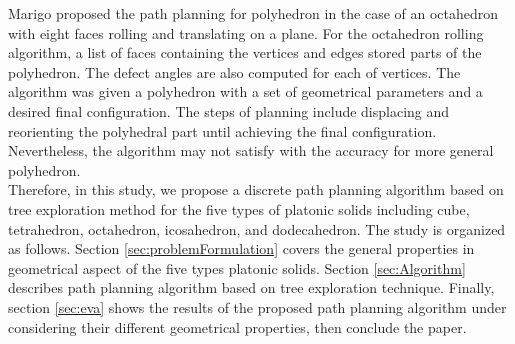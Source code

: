 \noindent Marigo \cite{Marigo00_PlanningMotion_Polyhedra_Rolling} proposed the path planning for polyhedron in the case of an octahedron with eight faces rolling and translating on a plane. For the octahedron rolling algorithm, a list of faces containing the vertices and edges stored parts of the polyhedron. The defect angles are also computed for each of vertices. The algorithm was given a polyhedron with a set of geometrical parameters and a desired final configuration. The steps of planning include displacing and reorienting the polyhedral part until achieving the final configuration. Nevertheless, the algorithm may not satisfy with the accuracy for more general polyhedron.\\

\noindent Therefore, in this study, we propose a discrete path planning algorithm based on tree exploration method for the five types of platonic solids including cube, tetrahedron, octahedron, icosahedron, and dodecahedron. 
%
The study is organized as follows. Section \ref{sec:problemFormulation} covers the general properties in geometrical aspect of the five types platonic solids. Section \ref{sec:Algorithm} describes path planning algorithm based on tree exploration technique. Finally, section \ref{sec:eva} shows the results of the proposed path planning algorithm under considering their different geometrical properties, then conclude the paper.

